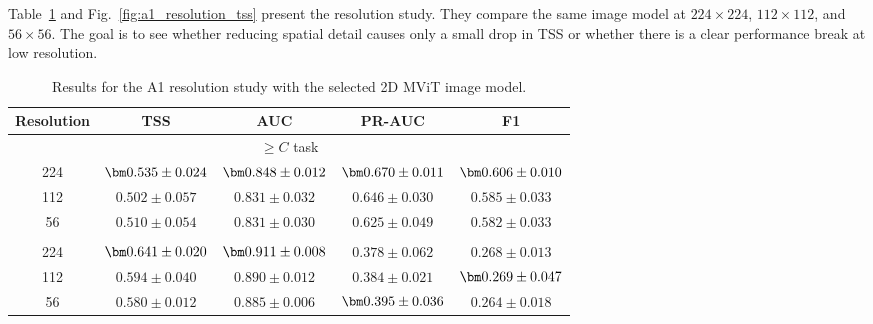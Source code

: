 Table~\ref{tab:single} and Fig.~\ref{fig:a1_resolution_tss} present the resolution study. They compare the same image model at $224 \times 224$, $112 \times 112$, and $56 \times 56$. The goal is to see whether reducing spatial detail causes only a small drop in TSS or whether there is a clear performance break at low resolution.

\begin{table}[H]
\caption{Results for the A1 resolution study with the selected 2D MViT image model.}
\label{tab:single}
\centering
\small
\renewcommand{\arraystretch}{1.15}
\setlength{\tabcolsep}{7pt}
\begin{tabular}{@{}ccccc@{}}
\toprule
Resolution & TSS & AUC & PR-AUC & F1 \\
\midrule
\multicolumn{5}{c}{$\geq C$ task} \\
\midrule
224 & $\best{0.535 \pm 0.024}$ & $\best{0.848 \pm 0.012}$ & $\best{0.670 \pm 0.011}$ & $\best{0.606 \pm 0.010}$ \\
112 & $0.502 \pm 0.057$ & $0.831 \pm 0.032$ & $0.646 \pm 0.030$ & $0.585 \pm 0.033$ \\
56 & $0.510 \pm 0.054$ & $0.831 \pm 0.030$ & $0.625 \pm 0.049$ & $0.582 \pm 0.033$ \\
\addlinespace
\multicolumn{5}{c}{$\geq M$ task} \\
\midrule
224 & $\best{0.641 \pm 0.020}$ & $\best{0.911 \pm 0.008}$ & $0.378 \pm 0.062$ & $0.268 \pm 0.013$ \\
112 & $0.594 \pm 0.040$ & $0.890 \pm 0.012$ & $0.384 \pm 0.021$ & $\best{0.269 \pm 0.047}$ \\
56 & $0.580 \pm 0.012$ & $0.885 \pm 0.006$ & $\best{0.395 \pm 0.036}$ & $0.264 \pm 0.018$ \\
\bottomrule
\end{tabular}
\end{table}

